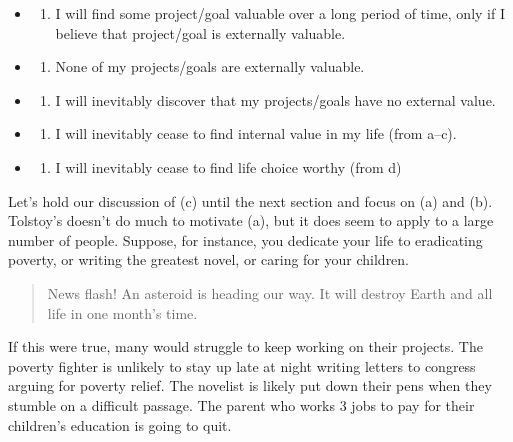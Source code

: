 \documentclass[9pt]{article}
\providecommand{\tightlist}{%
  \setlength{\itemsep}{0pt}\setlength{\parskip}{0pt}}
\begin{document}
\begin{itemize}
\item
  \begin{enumerate}
  \def\labelenumi{\alph{enumi})}
  \tightlist
  \item
    I will find some project/goal valuable over a long period of time,
    only if I believe that project/goal is externally valuable.
  \end{enumerate}
\item
  \begin{enumerate}
  \def\labelenumi{\alph{enumi})}
  \setcounter{enumi}{1}
  \tightlist
  \item
    None of my projects/goals are externally valuable.
  \end{enumerate}
\item
  \begin{enumerate}
  \def\labelenumi{\alph{enumi})}
  \setcounter{enumi}{2}
  \tightlist
  \item
    I will inevitably discover that my projects/goals have no external
    value.
  \end{enumerate}
\item
  \begin{enumerate}
  \def\labelenumi{\alph{enumi})}
  \setcounter{enumi}{3}
  \tightlist
  \item
    I will inevitably cease to find internal value in my life (from
    a--c).
  \end{enumerate}
\item
  \begin{enumerate}
  \def\labelenumi{\alph{enumi})}
  \setcounter{enumi}{4}
  \tightlist
  \item
    I will inevitably cease to find life choice worthy (from d)
  \end{enumerate}
\end{itemize}

Let's hold our discussion of (c) until the next section and focus on (a)
and (b). Tolstoy's doesn't do much to motivate (a), but it does seem to
apply to a large number of people. Suppose, for instance, you dedicate
your life to eradicating poverty, or writing the greatest novel, or
caring for your children.

\begin{quote}
News flash! An asteroid is heading our way. It will destroy Earth and
all life in one month's time.
\end{quote}

If this were true, many would struggle to keep working on their
projects. The poverty fighter is unlikely to stay up late at night
writing letters to congress arguing for poverty relief. The novelist is
likely put down their pens when they stumble on a difficult passage. The
parent who works 3 jobs to pay for their children's education is going
to quit.
\end{document}
